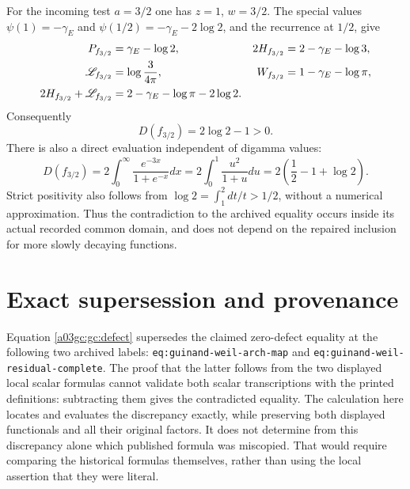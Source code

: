 For the incoming test $a=3/2$ one has $z=1$, $w=3/2$.
The special values
$\psi(1)=-\gamma_E$ and $\psi(1/2)=-\gamma_E-2\log2$,
and the recurrence at $1/2$, give
\cite[5.4.12--13 and 5.5.2]{a03gc:dlmf}
\begin{align}
 P_{f_{3/2}}&=\gamma_E-\log2,&
 2H_{f_{3/2}}&=2-\gamma_E-\log3,\notag\\
 \mathscr L_{f_{3/2}}&=\log\frac3{4\pi},&
 W_{f_{3/2}}&=1-\gamma_E-\log\pi,\notag\\
 2H_{f_{3/2}}+\mathscr L_{f_{3/2}}
   &=2-\gamma_E-\log\pi-2\log2.
 \label{a03gc:gc:counterexample-values}
\end{align}
Consequently
\begin{equation}
 \boxed{D(f_{3/2})=2\log2-1>0.}
 \label{a03gc:gc:counterexample}
\end{equation}
There is also a direct evaluation independent of digamma values:
\begin{equation}
 D(f_{3/2})=2\int_0^\infty\frac{e^{-3x}}{1+e^{-x}}dx
 =2\int_0^1\frac{u^2}{1+u}du
 =2\left(\frac12-1+\log2\right).
 \label{a03gc:gc:direct-example}
\end{equation}
Strict positivity also follows from
$\log2=\int_1^2dt/t>1/2$, without a numerical approximation.
Thus the contradiction to the archived equality occurs inside its actual
recorded common domain, and does not depend on the repaired inclusion for
more slowly decaying functions.

\section{Exact supersession and provenance}

Equation \eqref{a03gc:gc:defect} supersedes the claimed zero-defect equality at
the following two archived labels:
\texttt{eq:guinand-weil-arch-map} and
\texttt{eq:guinand-weil-residual-complete}.
The proof that the latter follows from the two displayed local scalar
formulas cannot validate both scalar transcriptions with the printed
definitions: subtracting them gives the contradicted equality.  The
calculation here locates and evaluates the discrepancy exactly, while
preserving both displayed functionals and all their original factors.
It does not determine from this discrepancy alone which published formula
was miscopied.  That would require comparing the historical formulas
themselves, rather than using the local assertion that they were literal.

